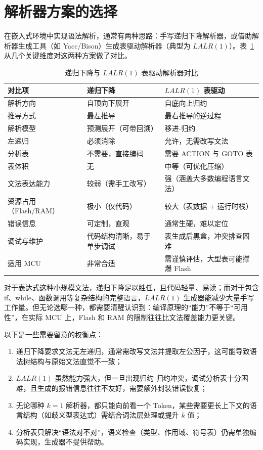 \section{解析器方案的选择}

在嵌入式环境中实现语法解析，通常有两种思路：手写递归下降解析器，或借助解析器生成工具（如 Yacc/Bison）生成表驱动解析器（典型为 $LALR(1)$）。表~\ref{tab:parser-choice} 从几个关键维度对这两种方案做了对比。

\begin{table}[htbp]
	\centering \small
	\caption{递归下降与 $LALR(1)$ 表驱动解析器对比}
	\label{tab:parser-choice}
	\begin{tabular}{lll}
		\toprule
		对比项 & 递归下降 & $LALR(1)$ 表驱动 \\
		\midrule
		解析方向 & 自顶向下展开 & 自底向上归约 \\
		推导方式 & 最左推导 & 最右推导的逆过程 \\
		解析模型 & 预测展开（可带回溯） & 移进-归约 \\
		左递归 & 必须消除 & 允许，无需改写文法 \\
		分析表 & 不需要，直接编码 & 需要 ACTION 与 GOTO 表 \\
		表体积 & 无 & 中等（可优化压缩） \\
		文法表达能力 & 较弱（需手工改写） & 强（涵盖大多数编程语言文法） \\
		资源占用（Flash/RAM） & 极小（仅代码） & 较大（表数据 + 运行时栈） \\
		错误信息 & 可定制，直观 & 通常生硬，难以定位 \\
		调试与维护 & 代码结构清晰，易于单步调试 & 表生成后黑盒，冲突排查困难 \\
		适用 MCU & 非常合适 & 需谨慎评估，大型表可能撑爆 Flash \\
		\bottomrule
	\end{tabular}
\end{table}

对于表达式这种小规模文法，递归下降足以胜任，且代码轻量、易读；而对于包含 if、while、函数调用等复杂结构的完整语言，$LALR(1)$ 生成器能减少大量手写工作量。但无论选哪一种，都需要清醒认识到：编译原理的“能力”不等于“可用性”，在实际 MCU 上，Flash 和 RAM 的限制往往比文法覆盖能力更关键。

以下是一些需要留意的权衡点：
\begin{enumerate}
	\item 递归下降要求文法无左递归，通常需改写文法并提取左公因子，这可能导致语法树结构与原始文法直觉不一致；
	\item $LALR(1)$ 虽然能力强大，但一旦出现归约-归约冲突，调试分析表十分困难，且生成的报错信息往往不友好，需要额外封装错误恢复；
	\item 无论哪种 $k=1$ 解析器，都只能向前看一个 Token，某些需要更长上下文的语言结构（如歧义型表达式）需结合词法层处理或提升 $k$ 值；
	\item 分析表只解决“语法对不对”，语义检查（类型、作用域、符号表）仍需单独编码实现，生成器不提供帮助。
\end{enumerate}

